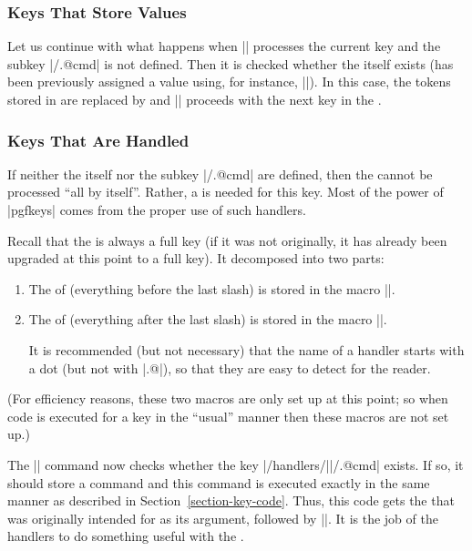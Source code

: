 \subsubsection{Keys That Store Values}

Let us continue with what happens when |\pgfkeys| processes the current key and
the subkey |/.@cmd| is not defined. Then it is checked whether the
 itself exists (has been previously assigned a value using, for
instance, |\pgfkeyssetvalue|). In this case, the tokens stored in 
are replaced by  and |\pgfkeys| proceeds with the next key in the
.


\subsubsection{Keys That Are Handled}
\label{section-key-handlers}

If neither the  itself nor the subkey |/.@cmd| are defined,
then the  cannot be processed ``all by itself''. Rather, a
 is needed for this key. Most of the power of |pgfkeys| comes
from the proper use of such handlers.

Recall that the  is always a full key (if it was not originally, it
has already been upgraded at this point to a full key). It decomposed into two
parts:

\begin{enumerate}
    \item The  of  (everything before the last slash) is
        stored in the macro |\pgfkeyscurrentpath|.
    \item The  of  (everything after the last slash) is
        stored in the macro |\pgfkeyscurrentname|.

        It is recommended (but not necessary) that the name of a handler starts
        with a dot (but not with |.@|), so that they are easy to detect for the
        reader.
\end{enumerate}

(For efficiency reasons, these two macros are only set up at this point; so
when code is executed for a key in the ``usual'' manner then these macros are
not set up.)

The |\pgfkeys| command now checks whether the key
|/handlers/||/.@cmd| exists. If so, it should store a command and
this command is executed exactly in the same manner as described in
Section~\ref{section-key-code}. Thus, this code gets the  that was
originally intended for  as its argument, followed by |\pgfeov|. It
is the job of the handlers to do something useful with the .

